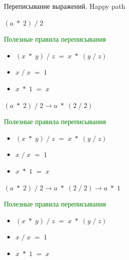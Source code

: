 \documentclass[aspectratio=169
  , xcolor={svgnames}
  , russian  %
  ]{beamer}
\begin{document}
\begin{frame}{Переписывание выражений. Happy path}

{
    \Huge{ \centering
    $(a \; *\; 2)\; / \;2$
    }
    
    \vspace{1cm} %
    
    {\fontsize{16.1}{12}\selectfont \textcolor{green}{Полезные правила переписывания}}
    {\fontsize{16.1}{12}\selectfont %
    \begin{itemize}
        \item $(x\; * \;y) \;/ \;z \;= \;x\; * \;(y \;/ \;z)$
        \item $x \; / \; x \; = \; 1$
        \item $x \; * \; 1 \; = \; x$ 
    \end{itemize}
    }
}

{
    \Huge{ \centering
    $(a \; *\; 2)\; / \;2 \rightarrow a \;*\; (2\; /\; 2)$
    }
    
    \vspace{1cm} %
    
    {\fontsize{16.1}{12}\selectfont \textcolor{green}{Полезные правила переписывания}}
    {\fontsize{16.1}{12}\selectfont %
    \begin{itemize}
        \item $(x\; * \;y) \;/ \;z \;= \;x\; * \;(y \;/ \;z)$
        \item $x \; / \; x \; = \; 1$
        \item $x \; * \; 1 \; = \; x$ 
    \end{itemize}
    }
}

{
    \Huge{ \centering
    $(a \; *\; 2)\; / \;2 \rightarrow a \;*\; (2\; /\; 2) \rightarrow a \;*\; 1$
    }
    
    \vspace{1cm} %
    
    {\fontsize{16.1}{12}\selectfont \textcolor{green}{Полезные правила переписывания}}
    {\fontsize{16.1}{12}\selectfont %
    \begin{itemize}
        \item $(x\; * \;y) \;/ \;z \;= \;x\; * \;(y \;/ \;z)$
        \item $x \; / \; x \; = \; 1$
        \item $x \; * \; 1 \; = \; x$ 
    \end{itemize}
    }
}


\end{frame}
\end{document}
